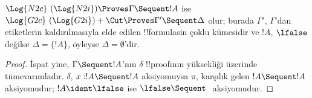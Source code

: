 \documentclass[../../../include/open-logic-section]{subfiles}
\begin{document}


\begin{prop} $\Log{N2c}\ (\Log{N2i}) \Proves
\Gamma \Sequent !A$ ise $\Log{G2c}\ (\Log{G2i}) + \Cut \Proves \Gamma'
\Sequent \Delta$ olur; burada $\Gamma'$, $\Gamma$'dan etiketlerin
kaldırılmasıyla elde edilen !!{formula}s{}in çoklu kümesidir ve $!A$,
$\lfalse$ değilse $\Delta = \{!A\}$, öyleyse $\Delta = \emptyset$'dir.
\end{prop}

\begin{proof}
İspat yine, $\Gamma \Sequent !A$'nın $\delta$ !!{proof}{}ının yüksekliği üzerinde
tümevarımladır. $\delta$, $x:!A \Sequent !A$ aksiyomuysa $\pi$, karşılık gelen
$!A \Sequent !A$ aksiyomudur; $!A \ident \lfalse$ ise $\lfalse \Sequent \ $
aksiyomudur.


\end{proof}
\end{document}
